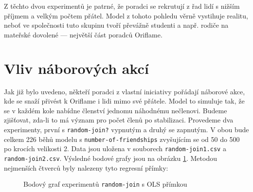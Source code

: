\documentclass[a4wide,12pt]{report}
\begin{document}
Z těchto dvou experimentů je patrné, že poradci se rekrutují z řad lidí s nižším příjmem a velkým počtem přátel. Model z tohoto pohledu věrně vystihuje realitu, neboť ve společnosti tuto skupinu tvoří převážně studenti a např. rodiče na mateřské dovolené --- největší část poradců Oriflame.
\section{Vliv náborových akcí}
Jak již bylo uvedeno, někteří poradci z vlastní iniciativy pořádají náborové akce, kde se snaží přivést k Oriflame i lidi mimo své přátele. Model to simuluje tak, že se v každém kole nabídne členství jednomu náhodnému nečlenovi. Budeme zjišťovat, zda-li to má význam pro počet členů po stabilizaci. Provedeme dva experimenty, první s \texttt{random-join?} vypnutým a druhý se zapnutým. V obou bude celkem 226 běhů modelu s \texttt{number-of-friendships} zvyšujícím se od 50 do 500 po krocích velikosti 2. Data jsou uložena v souborech \texttt{random-join1.csv} a \texttt{random-join2.csv}. Výsledné bodové grafy jsou na obrázku \ref{fig:random-join}. Metodou nejmenších čtverců byly nalezeny tyto regresní přímky:
\begin{figure}[h]
  \centering
  \caption{Bodový graf experimentů \texttt{random-join} s OLS přímkou}
  \label{fig:random-join}
\end{figure}
\end{document}
